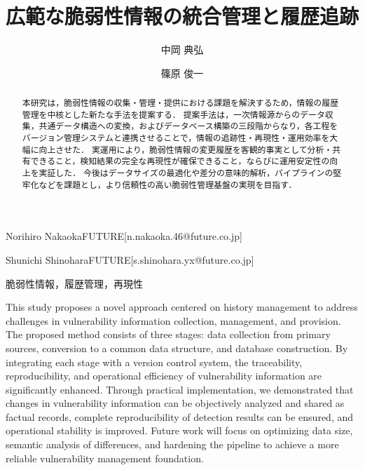\documentclass{css}
\begin{document}

\title{広範な脆弱性情報の統合管理と履歴追跡}



\author{中岡 典弘}{Norihiro Nakaoka}{FUTURE}[n.nakaoka.46@future.co.jp]
\author{篠原 俊一}{Shunichi Shinohara}{FUTURE}[s.shinohara.yx@future.co.jp]

\begin{abstract}
本研究は，脆弱性情報の収集・管理・提供における課題を解決するため，情報の履歴管理を中核とした新たな手法を提案する．
提案手法は，一次情報源からのデータ収集，共通データ構造への変換，およびデータベース構築の三段階からなり，各工程をバージョン管理システムと連携させることで，情報の追跡性・再現性・運用効率を大幅に向上させた．
実運用により，脆弱性情報の変更履歴を客観的事実として分析・共有できること，検知結果の完全な再現性が確保できること，ならびに運用安定性の向上を実証した．
今後はデータサイズの最適化や差分の意味的解析，パイプラインの堅牢化などを課題とし，より信頼性の高い脆弱性管理基盤の実現を目指す．
\end{abstract}


\begin{jkeyword}
脆弱性情報，履歴管理，再現性
\end{jkeyword}

\begin{eabstract}
This study proposes a novel approach centered on history management to address challenges in vulnerability information collection, management, and provision.
The proposed method consists of three stages: data collection from primary sources, conversion to a common data structure, and database construction.
By integrating each stage with a version control system, the traceability, reproducibility, and operational efficiency of vulnerability information are significantly enhanced.
Through practical implementation, we demonstrated that changes in vulnerability information can be objectively analyzed and shared as factual records, complete reproducibility of detection results can be ensured, and operational stability is improved.
Future work will focus on optimizing data size, semantic analysis of differences, and hardening the pipeline to achieve a more reliable vulnerability management foundation.
\end{eabstract}
\end{document}
